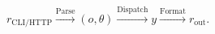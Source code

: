 \documentclass[border=4pt]{standalone}
\begin{document}
$\displaystyle
r_{\mathrm{CLI/HTTP}}
\xrightarrow{\mathrm{Parse}}(o,\theta)
\xrightarrow{\mathrm{Dispatch}}y
\xrightarrow{\mathrm{Format}}r_{\mathrm{out}}.
$
\end{document}
